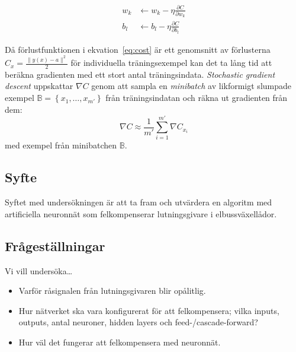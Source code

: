 \begin{align}
	w_k &\leftarrow w_k - \eta \frac{\partial C}{\partial w_k} \\
	b_l &\leftarrow b_l - \eta \frac{\partial C}{\partial b_l}
\end{align}

Då förlustfunktionen i ekvation~\eqref{eq:cost} är ett genomsnitt av
förlusterna $ C_x = \frac{\lVert y(x) - a \rVert^2}{2} $ för individuella träningsexempel
kan det ta lång tid att beräkna gradienten med ett stort antal träningsindata.
\emph{Stochastic gradient descent} uppskattar $ \nabla C $ genom att
sampla en \emph{minibatch} av likformigt slumpade exempel
$ \mathbb{B} = \left\{ x_1, \dotsc, x_{m'} \right\} $ från träningsindatan
och räkna ut gradienten från dem:
\begin{equation}
	\nabla C \approx \frac{1}{m'} \sum^{m'}_{i=1} \nabla C_{x_i}
\end{equation}
med exempel från minibatchen $ \mathbb{B} $.

\subsection{Syfte}
Syftet med undersökningen är att ta fram och utvärdera en algoritm med
artificiella neuronnät som felkompenserar lutningsgivare i elbussväxellådor.

\subsection{Frågeställningar}
Vi vill undersöka\ldots
\begin{itemize}
	\item Varför råsignalen från lutningsgivaren blir opålitlig.
	\item Hur nätverket ska vara konfigurerat för att felkompensera; vilka inputs,
		outputs, antal neuroner, hidden layers och feed-/cascade-forward?
	\item Hur väl det fungerar att felkompensera med neuronnät.
\end{itemize}
